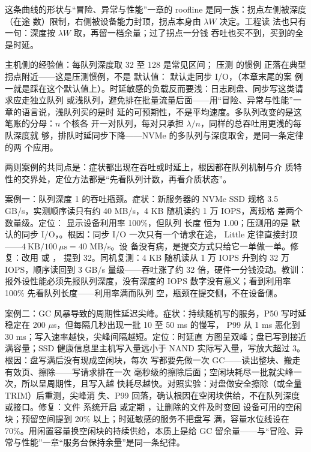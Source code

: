 这条曲线的形状与“冒险、异常与性能”一章的 roofline 是同一族：拐点左侧被深度（在途
数）限制，右侧被设备能力封顶，拐点本身由 $\lambda W$ 决定。工程读
法也只有一句：深度按 $\lambda W$ 取，再留一档余量；过了拐点一分钱
吞吐也买不到，买到的全是时延。

主机侧的经验值：每队列深度取 32 至 128 是常见区间； 压测
的惯例  正落在典型拐点附近——这是压测惯例，不是
默认值： 默认走同步 I/O，（本章末尾的案
例一就是踩在这个默认值上）。时延敏感的负载反而要浅：日志刷盘、同步写这类请求应走独立队列
或浅队列，避免排在批量流量后面——用“冒险、异常与性能”一章的语言说，浅队列买的是时
延的可预期性，不是平均速度。多队列改变的是这笔账的分母：$n$ 个核各
开一对队列，每对只承担 $\lambda/n$，同样的总吞吐用更浅的每队深度就
够，排队时延同步下降——NVMe 的多队列与深度取舍，是同一条定律的两
个应用。

两则案例的共同点是：症状都出现在吞吐或时延上，根因都在队列机制与介
质特性的交界处，定位方法都是“先看队列计数，再看介质状态”。

案例一：队列深度 1 的吞吐瓶颈。症状：新服务器的 NVMe SSD 规格
3.5 GB/s，实测顺序读只有约 40 MB/s，4 KB 随机读约 1 万 IOPS，离规格
差两个数量级。定位： 显示设备利用率 100\%，但队列
长度  恒为 1.00；压测用的是  默认的同步
I/O，。根因：同步 I/O 一次只有一个请求在途，
Little 定律直接封顶——$4\ \text{KB}/100\ \mu\text{s}=40$ MB/s。设
备没有病，是提交方式只给它一单做一单。修复：改用  或
， 提到 32。同机复测：4 KB 随机读从 1
万 IOPS 升到约 32 万 IOPS，顺序读回到 3 GB/s 量级——吞吐涨了约 32
倍，硬件一分钱没动。教训：报外设性能必须先报队列深度，没有深度的
IOPS 数字没有意义；看到利用率 100\% 先看队列长度——利用率满而队列
空，瓶颈在提交侧，不在设备侧。

案例二：GC 风暴导致的周期性延迟尖峰。症状：持续随机写的服务，P50
写时延稳定在 200 $\mu$s，但每隔几秒出现一批 10 至 50 ms 的慢写，
P99 从 1 ms 恶化到 30 ms；写入速率越快，尖峰间隔越短。定位：时延直
方图呈双峰；盘已写到接近满容量；SSD 健康信息里主机写入量远小于
NAND 实际写入量，写放大超过 3。根因：盘写满后没有现成空闲块，每次
写都要先做一次 GC——读出整块、搬走有效页、擦除——写请求排在一次
毫秒级的擦除后面；空闲块耗尽一批就尖峰一次，所以呈周期性，且写入越
快耗尽越快。对照实验：对盘做安全擦除（或全量 TRIM）后重测，尖峰消
失、P99 回落，确认根因在空闲块供给，不在队列深度或接口。修复：文件
系统开启  或定期 ，让删除的文件及时变回
设备可用的空闲块；预留空间提到 20\% 以上；时延敏感的服务不把盘写
满，容量水位线设在 70\%。用闲置容量换空闲块的持续供给，本质上是给
GC 留余量——与“冒险、异常与性能”一章“服务台保持余量”是同一条纪律。

